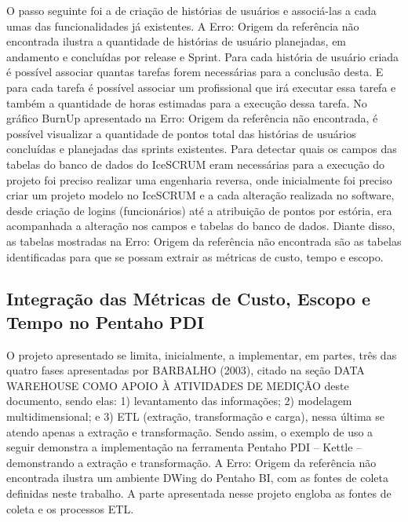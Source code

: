 O passo seguinte foi a de criação de histórias de usuários e associá-las a cada umas das funcionalidades já existentes. A Erro: Origem da referência não encontrada ilustra a quantidade de histórias de usuário planejadas, em andamento e concluídas por release e Sprint.
Para cada história de usuário criada é possível associar quantas tarefas forem necessárias para a conclusão desta. E para cada tarefa é possível associar um profissional que irá executar essa tarefa e também a quantidade de horas estimadas para a execução dessa tarefa.
No gráfico BurnUp apresentado na Erro: Origem da referência não encontrada, é possível visualizar a quantidade de pontos total das histórias de usuários concluídas e planejadas das sprints existentes.
Para detectar quais os campos das tabelas do banco de dados do IceSCRUM eram necessárias para a execução do projeto foi preciso realizar uma engenharia reversa, onde inicialmente foi preciso criar um projeto modelo no IceSCRUM e a cada alteração realizada no software, desde criação de logins (funcionários) até a atribuição de pontos por estória, era acompanhada a alteração nos campos e tabelas do banco de dados.
Diante disso, as tabelas mostradas na Erro: Origem da referência não encontrada são as tabelas identificadas para que se possam extrair as métricas de custo, tempo e escopo.

\subsection{Integração das Métricas de Custo, Escopo e Tempo no Pentaho PDI}
O projeto apresentado se limita, inicialmente, a implementar, em partes, três das quatro fases apresentadas por BARBALHO (2003), citado na seção DATA WAREHOUSE COMO APOIO À ATIVIDADES DE MEDIÇÃO deste documento, sendo elas: 1) levantamento das informações; 2) modelagem multidimensional; e 3) ETL (extração, transformação e carga), nessa última se atendo apenas a extração e transformação. Sendo assim, o exemplo de uso a seguir demonstra a implementação na ferramenta Pentaho PDI – Kettle – demonstrando a extração e transformação. 
A Erro: Origem da referência não encontrada ilustra um ambiente DWing do Pentaho BI, com as fontes de coleta definidas neste trabalho. A parte apresentada nesse projeto engloba as fontes de coleta e os processos ETL.


